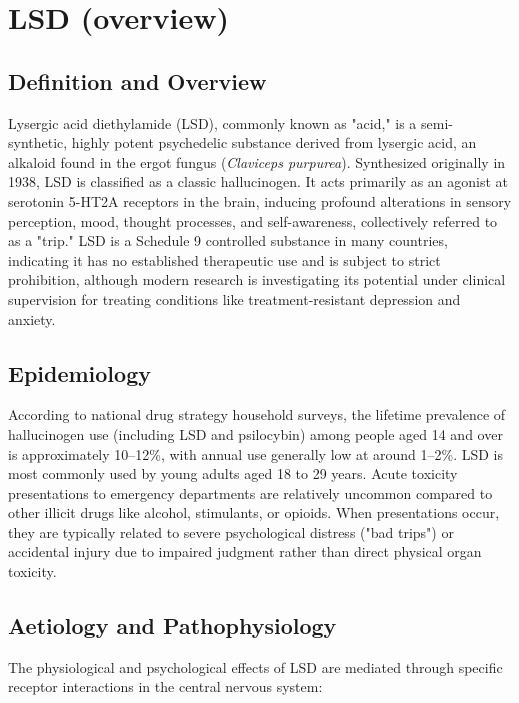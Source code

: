 \chapter{LSD (overview)}

\section*{Definition and Overview}
Lysergic acid diethylamide (LSD), commonly known as "acid," is a semi-synthetic, highly potent psychedelic substance derived from lysergic acid, an alkaloid found in the ergot fungus (\textit{Claviceps purpurea}). Synthesized originally in 1938, LSD is classified as a classic hallucinogen. It acts primarily as an agonist at serotonin 5-HT2A receptors in the brain, inducing profound alterations in sensory perception, mood, thought processes, and self-awareness, collectively referred to as a "trip." LSD is a Schedule 9 controlled substance in many countries, indicating it has no established therapeutic use and is subject to strict prohibition, although modern research is investigating its potential under clinical supervision for treating conditions like treatment-resistant depression and anxiety.

\section*{Epidemiology}
According to national drug strategy household surveys, the lifetime prevalence of hallucinogen use (including LSD and psilocybin) among people aged 14 and over is approximately 10--12\%, with annual use generally low at around 1--2\%. LSD is most commonly used by young adults aged 18 to 29 years. Acute toxicity presentations to emergency departments are relatively uncommon compared to other illicit drugs like alcohol, stimulants, or opioids. When presentations occur, they are typically related to severe psychological distress ("bad trips") or accidental injury due to impaired judgment rather than direct physical organ toxicity.

\section*{Aetiology and Pathophysiology}
The physiological and psychological effects of LSD are mediated through specific receptor interactions in the central nervous system:

